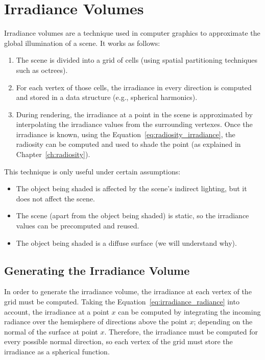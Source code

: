 \chapter{Irradiance Volumes}

Irradiance volumes are a technique used in computer graphics to approximate the global illumination of a scene. It works as follows:
\begin{enumerate}
    \item The scene is divided into a grid of cells (using spatial partitioning techniques such as octrees).
    \item For each vertex of those cells, the irradiance in every direction is computed and stored in a data structure (e.g., spherical harmonics).
    \item During rendering, the irradiance at a point in the scene is approximated by interpolating the irradiance values from the surrounding vertexes. Once the irradiance is known, using the Equation~\ref{eq:radiosity_irradiance}, the radiosity can be computed and used to shade the point (as explained in Chapter~\ref{ch:radiosity}).
\end{enumerate}

This technique is only useful under certain assumptions:
\begin{itemize}
    \item The object being shaded is affected by the scene's indirect lighting, but it does not affect the scene.
    \item The scene (apart from the object being shaded) is static, so the irradiance values can be precomputed and reused.
    \item The object being shaded is a diffuse surface (we will understand why).
\end{itemize}

\section{Generating the Irradiance Volume}

In order to generate the irradiance volume, the irradiance at each vertex of the grid must be computed. Taking the Equation~\ref{eq:irradiance_radiance} into account, the irradiance at a point $x$ can be computed by integrating the incoming radiance over the hemisphere of directions above the point $x$; depending on the normal of the surface at point $x$. Therefore, the irradiance must be computed for every possible normal direction, so each vertex of the grid must store the irradiance as a spherical function.\\

